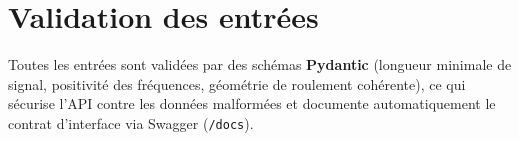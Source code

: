 \section{Validation des entrées}
Toutes les entrées sont validées par des schémas \textbf{Pydantic} (longueur minimale de
signal, positivité des fréquences, géométrie de roulement cohérente), ce qui sécurise l'API
contre les données malformées et documente automatiquement le contrat d'interface via
Swagger (\texttt{/docs}).
